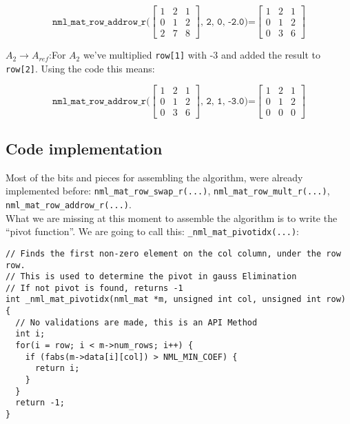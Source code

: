 $$
\texttt{nml\_mat\_row\_addrow\_r(}
\begin{bmatrix}
1 & 2 & 1 \\
0 & 1 & 2 \\
2 & 7 & 8
\end{bmatrix}
\texttt{, 2, 0, -2.0)=}
\begin{bmatrix}
1 & 2 & 1 \\
0 & 1 & 2 \\
0 & 3 & 6
\end{bmatrix}
$$

$A_2 \rightarrow A_{ref}$:\quad For $A_2$ we’ve multiplied {\tt row[1]} with -3 and added the result to {\tt row[2]}. Using the code this means:

$$
\texttt{nml\_mat\_row\_addrow\_r(}
\begin{bmatrix}
1 & 2 & 1 \\
0 & 1 & 2 \\
0 & 3 & 6
\end{bmatrix}
\texttt{, 2, 1, -3.0)=}
\begin{bmatrix}
1 & 2 & 1 \\
0 & 1 & 2 \\
0 & 0 & 0
\end{bmatrix}
$$

\subsection{Code implementation}

Most of the bits and pieces for assembling the algorithm, were already implemented before: {\tt nml\_mat\_row\_swap\_r(...)}, {\tt nml\_mat\_row\_mult\_r(...)}, {\tt nml\_mat\_row\_addrow\_r(...)}.
\\

What we are missing at this moment to assemble the algorithm is to write the ``pivot function''. We are going to call this: {\tt \_nml\_mat\_pivotidx(...)}:

\begin{verbatim}
// Finds the first non-zero element on the col column, under the row row.
// This is used to determine the pivot in gauss Elimination
// If not pivot is found, returns -1
int _nml_mat_pivotidx(nml_mat *m, unsigned int col, unsigned int row) {
  // No validations are made, this is an API Method
  int i;
  for(i = row; i < m->num_rows; i++) {
    if (fabs(m->data[i][col]) > NML_MIN_COEF) {
      return i;
    }
  }
  return -1;
}
\end{verbatim}

